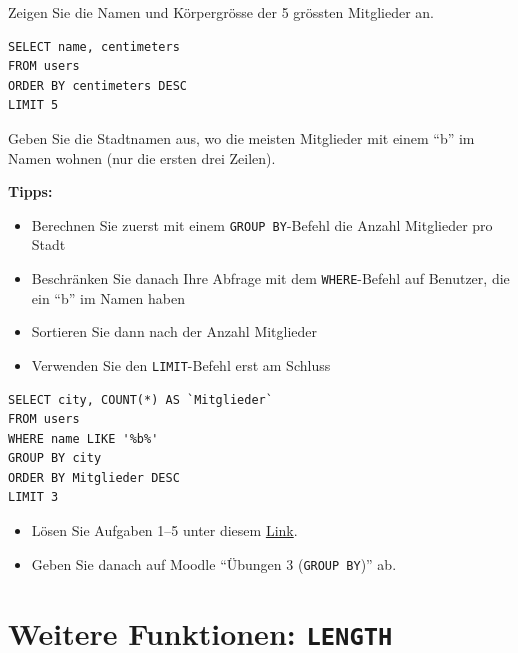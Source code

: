 \begin{myexercise}
  Zeigen Sie die Namen und Körpergrösse der 5 grössten Mitglieder an.
  \begin{myanswer}
    \begin{lstlisting}
SELECT name, centimeters
FROM users
ORDER BY centimeters DESC
LIMIT 5
\end{lstlisting}
  \end{myanswer}
\end{myexercise}

\begin{mychallenge}
  Geben Sie die Stadtnamen aus, wo die meisten Mitglieder mit einem \enquote{b} im Namen wohnen (nur die ersten drei Zeilen).

  \textbf{Tipps:}
  \begin{itemize}
    \item Berechnen Sie zuerst mit einem \lstinline|GROUP BY|-Befehl die Anzahl Mitglieder pro Stadt
    \item Beschränken Sie danach Ihre Abfrage mit dem \lstinline|WHERE|-Befehl auf Benutzer, die ein \enquote{b} im Namen haben
    \item Sortieren Sie dann nach der Anzahl Mitglieder
    \item Verwenden Sie den \lstinline|LIMIT|-Befehl erst am Schluss
  \end{itemize}

  \begin{myanswer}
    \begin{lstlisting}
SELECT city, COUNT(*) AS `Mitglieder`
FROM users
WHERE name LIKE '%b%'
GROUP BY city
ORDER BY Mitglieder DESC
LIMIT 3
\end{lstlisting}
  \end{myanswer}
\end{mychallenge}

\begin{myexercise}
  \begin{itemize}
    \item Lösen Sie Aufgaben 1--5 unter diesem \href{https://sql-tutorial.de/home/uebungen.php?lektion=4}{Link}.
    \item Geben Sie danach auf Moodle \enquote{Übungen 3 (\lstinline|GROUP BY|)} ab.
  \end{itemize}
\end{myexercise}

\section{Weitere Funktionen: \texorpdfstring{\lstinline|LENGTH|}{LENGTH}}

